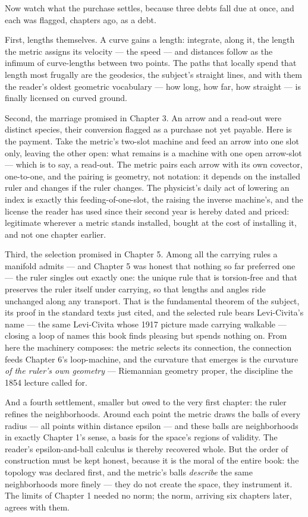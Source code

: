 Now watch what the purchase settles, because three debts fall due at once,
and each was flagged, chapters ago, as a debt.

First, lengths themselves. A curve gains a length: integrate, along it,
the length the metric assigns its velocity --- the speed --- and distances
follow as the infimum of curve-lengths between two points. The paths that
locally spend that length most frugally are the geodesics, the subject's
straight lines, and with them the reader's oldest geometric vocabulary ---
how long, how far, how straight --- is finally licensed on curved ground.

Second, the marriage promised in Chapter 3. An arrow and a read-out were
distinct species, their conversion flagged as a purchase not yet payable.
Here is the payment. Take the metric's two-slot machine and feed an arrow
into one slot only, leaving the other open: what remains is a machine with
one open arrow-slot --- which is to say, a read-out. The metric pairs each
arrow with its own covector, one-to-one, and the pairing is geometry, not
notation: it depends on the installed ruler and changes if the ruler
changes. The physicist's daily act of lowering an index is exactly this
feeding-of-one-slot, the raising the inverse machine's, and the license
the reader has used since their second year is hereby dated and priced:
legitimate wherever a metric stands installed, bought at the cost of
installing it, and not one chapter earlier.

Third, the selection promised in Chapter 5. Among all the carrying rules a
manifold admits --- and Chapter 5 was honest that nothing so far preferred
one --- the ruler singles out exactly one: the unique rule that is
torsion-free and that preserves the ruler itself under carrying, so that
lengths and angles ride unchanged along any transport. That is the
fundamental theorem of the subject, its proof in the standard texts just
cited, and the selected rule bears Levi-Civita's name --- the same
Levi-Civita whose 1917 picture made carrying walkable --- closing a loop
of names this book finds pleasing but spends nothing on. From here the
machinery composes: the metric selects its connection, the connection
feeds Chapter 6's loop-machine, and the curvature that emerges is the
curvature \emph{of the ruler's own geometry} --- Riemannian geometry
proper, the discipline the 1854 lecture called for.

And a fourth settlement, smaller but owed to the very first chapter: the
ruler refines the neighborhoods. Around each point the metric draws the
balls of every radius --- all points within distance epsilon --- and these
balls are neighborhoods in exactly Chapter 1's sense, a basis for the
space's regions of validity. The reader's epsilon-and-ball calculus is
thereby recovered whole. But the order of construction must be kept
honest, because it is the moral of the entire book: the topology was
declared first, and the metric's balls \emph{describe} the same
neighborhoods more finely --- they do not create the space, they
instrument it. The limits of Chapter 1 needed no norm; the norm, arriving
six chapters later, agrees with them.

